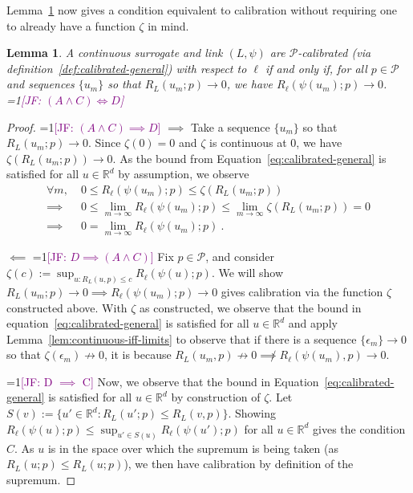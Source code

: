 \documentclass[11pt]{article} %
\newcommand{\Comments}{1}
\newcommand{\mynote}[2]{\ifnum\Comments=1\textcolor{#1}{#2}\fi}
\newcommand{\jessie}[1]{\mynote{purple}{[JF: #1]}}
\newcommand{\reals}{\mathbb{R}}
\renewcommand{\P}{\mathcal{P}}
\newtheorem{lemma}{Lemma}
\begin{document}
Lemma~\ref{lem:calib-converging-regrets} now gives a condition equivalent to calibration without requiring one to already have a function $\zeta$ in mind.
\begin{lemma}\label{lem:calib-converging-regrets}
	A continuous surrogate and link $(L,\psi)$ are $\P$-calibrated (via definition~\ref{def:calibrated-general}) with respect to $\ell$ if and only if, for all $p \in \P$ and sequences $\{u_m\}$ so that $R_L(u_m; p) \to 0$, we have $R_\ell(\psi(u_m); p) \to 0$.
	\jessie{$(A \wedge C) \iff D$}
\end{lemma}
\begin{proof}
\jessie{$(A \wedge C) \implies D$}
	$\implies$ Take a sequence $\{u_m\}$ so that $R_L(u_m;p) \to 0$.
	Since $\zeta(0) = 0$ and $\zeta$ is continuous at $0$, we have $\zeta(R_L(u_m;p)) \to 0$.
	As the bound from Equation~\eqref{eq:calibrated-general} is satisfied for all $u \in \reals^d$ by assumption, we observe
	\begin{align*}
	\forall m, \; &0 \leq R_\ell(\psi(u_m); p) \leq \zeta(R_L(u_m;p))\\
	\implies &0 \leq \lim_{m \to \infty} R_\ell(\psi(u_m); p) \leq \lim_{m \to \infty} \zeta(R_L(u_m;p)) = 0\\
	\implies &0 = \lim_{m\to\infty} R_\ell(\psi(u_m); p) ~.~
	\end{align*}
	
	
	$\impliedby$ 
\jessie{$D \implies (A \wedge C)$}
	Fix $p \in \P$, and consider $\zeta(c) := \sup_{u: R_L(u,p) \leq c} R_\ell(\psi(u); p)$.  
	We will show $R_L(u_m; p) \to 0 \implies R_\ell(\psi(u_m); p) \to 0$ gives calibration via the function $\zeta$ constructed above. 
	With $\zeta$ as constructed, we observe that the bound in equation~\eqref{eq:calibrated-general} is satisfied for all $u \in \reals^d$ and apply Lemma~\ref{lem:continuous-iff-limits} to observe that if there is a sequence $\{\epsilon_m\} \to 0$ so that $\zeta(\epsilon_m) \not \to 0$, it is because $R_L(u_m, p) \not \to 0 \not\implies R_\ell(\psi(u_m), p) \to 0$.
	

\jessie{D $\implies$ C}
Now, we observe that the bound in Equation~\eqref{eq:calibrated-general} is satisfied for all $u \in \reals^d$ by construction of $\zeta$.
Let $S(v) := \{u' \in \reals^d : R_L(u';p) \leq R_L(v,p) \}$.
Showing $R_\ell(\psi(u);p) \leq \sup_{u' \in S(u)} R_\ell(\psi(u') ; p)$ for all $u \in \reals^d$ gives the condition $C$.
As $u$ is in the space over which the supremum is being taken (as $R_L(u;p) \leq R_L(u;p)$), we then have calibration by definition of the supremum.


\end{proof}
\end{document}
